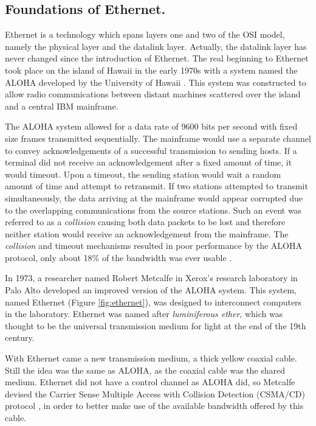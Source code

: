 \subsection{Foundations of Ethernet.}

Ethernet is a technology which spans layers one and two of the OSI model, namely the physical layer and the datalink layer. Actually, the datalink layer has never changed since the introduction of Ethernet. The real beginning to Ethernet took place on the island of Hawaii in the early 1970s with a system named the ALOHA developed by the University of Hawaii \cite{aloha}. This system was constructed to allow radio communications between distant machines scattered over the island and a central IBM mainframe.

The ALOHA system allowed for a data rate of 9600 bits per second with fixed size frames transmitted sequentially. The mainframe would use a separate channel to convey acknowledgements of a successful transmission to sending hosts. If a terminal did not receive an acknowledgement after a fixed amount of time, it would timeout. Upon a timeout, the sending station would wait a random amount of time and attempt to retransmit. If two stations attempted to transmit simultaneously, the data arriving at the mainframe would appear corrupted due to the overlapping communications from the source stations. Such an event was referred to as a \textit{collision} causing both data packets to be lost and therefore neither station would receive an acknowledgement from the mainframe. The \textit{collision} and timeout mechanisms resulted in poor performance by the ALOHA protocol, only about 18\% of the bandwidth was ever usable \cite{Tanenbaum}.

In 1973, a researcher named Robert Metcalfe in Xerox's research laboratory in Palo Alto developed an improved version of the ALOHA system. This system, named Ethernet (Figure \ref{fig:ethernet}), was designed to interconnect computers in the laboratory. Ethernet was named after \textit{luminiferous ether}, which was thought to be the universal transmission medium for light at the end of the 19th century.


With Ethernet came a new transmission medium, a thick yellow coaxial cable. Still the idea was the same as ALOHA, as the coaxial cable was the shared medium. Ethernet did not have a control channel as ALOHA did, so Metcalfe devised the Carrier Sense Multiple Access with Collision Detection (CSMA/CD) protocol \cite{Tanenbaum}, in order to better make use of the available bandwidth offered by this cable. 

